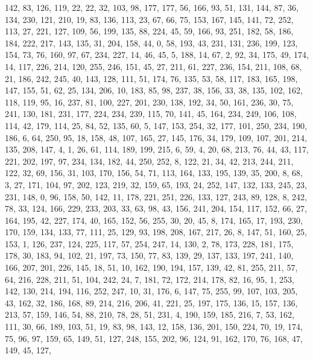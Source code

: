 \begin{DoxyCode}
       142, 83, 126, 119, 22, 22, 32, 103, 98, 177, 177, 56, 166, 93, 51, 131, 144, 87, 36, 134, 230, 121, 210,
       19, 83, 136, 113, 23, 67, 66, 75, 153, 167, 145, 141, 72, 252, 113, 27, 221, 127, 109, 56, 199, 135, 88, 224,
       45, 59, 166, 93, 251, 182, 58, 186, 184, 222, 217, 143, 135, 31, 204, 158, 44, 0, 58, 193, 43, 231, 131,
       236, 199, 123, 154, 73, 76, 160, 97, 67, 234, 227, 14, 46, 45, 5, 188, 14, 67, 2, 92, 34, 175, 49, 174, 14,
       117, 226, 214, 120, 255, 246, 151, 45, 27, 211, 61, 227, 236, 154, 211, 108, 68, 21, 186, 242, 245, 40, 143,
       128, 111, 51, 174, 76, 135, 53, 58, 117, 183, 165, 198, 147, 155, 51, 62, 25, 134, 206, 10, 183, 85, 98, 237,
       38, 156, 33, 38, 135, 102, 162, 118, 119, 95, 16, 237, 81, 100, 227, 201, 230, 138, 192, 34, 50, 161, 236,
       30, 75, 241, 130, 181, 231, 177, 224, 234, 239, 115, 70, 141, 45, 164, 234, 249, 106, 108, 114, 42, 179, 114,
       25, 84, 52, 135, 60, 5, 147, 153, 254, 32, 177, 101, 250, 234, 190, 186, 6, 64, 250, 95, 18, 158, 48, 107,
       165, 27, 145, 176, 34, 179, 109, 107, 201, 214, 135, 208, 147, 4, 1, 26, 61, 114, 189, 199, 215, 6, 59, 4,
       20, 68, 213, 76, 44, 43, 117, 221, 202, 197, 97, 234, 134, 182, 44, 250, 252, 8, 122, 21, 34, 42, 213, 244,
       211, 122, 32, 69, 156, 31, 103, 170, 156, 54, 71, 113, 164, 133, 195, 139, 35, 200, 8, 68, 3, 27, 171, 104,
       97, 202, 123, 219, 32, 159, 65, 193, 24, 252, 147, 132, 133, 245, 23, 231, 148, 0, 96, 158, 50, 142, 11, 178,
       221, 251, 226, 133, 127, 243, 89, 128, 8, 242, 78, 33, 124, 166, 229, 233, 203, 33, 63, 98, 43, 156, 241,
       204, 154, 117, 152, 66, 27, 164, 195, 42, 227, 174, 40, 165, 152, 56, 255, 30, 20, 45, 8, 174, 165, 17, 193,
       230, 170, 159, 134, 133, 77, 111, 25, 129, 93, 198, 208, 167, 217, 26, 8, 147, 51, 160, 25, 153, 1, 126,
       237, 124, 225, 117, 57, 254, 247, 14, 130, 2, 78, 173, 228, 181, 175, 178, 30, 183, 94, 102, 21, 197, 73, 150,
       77, 83, 139, 29, 137, 133, 197, 241, 140, 166, 207, 201, 226, 145, 18, 51, 10, 162, 190, 194, 157, 139, 42,
       81, 255, 211, 57, 64, 216, 228, 211, 51, 104, 242, 24, 7, 181, 72, 172, 214, 178, 82, 16, 95, 1, 253, 142,
       130, 214, 194, 116, 252, 247, 10, 31, 176, 6, 147, 75, 255, 99, 107, 103, 205, 43, 162, 32, 186, 168, 89,
       214, 216, 206, 41, 221, 25, 197, 175, 136, 15, 157, 136, 213, 57, 159, 146, 54, 88, 210, 78, 28, 51, 231, 4,
       190, 159, 185, 216, 7, 53, 162, 111, 30, 66, 189, 103, 51, 19, 83, 98, 143, 12, 158, 136, 201, 150, 224, 70,
       19, 174, 75, 96, 97, 159, 65, 149, 51, 127, 248, 155, 202, 96, 124, 91, 162, 170, 76, 168, 47, 149, 45, 127,

\end{DoxyCode}
